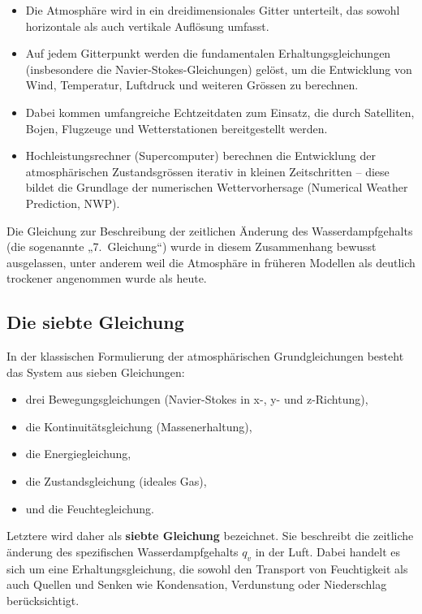 \begin{itemize}
    \item Die Atmosphäre wird in ein dreidimensionales Gitter unterteilt, das sowohl horizontale als auch vertikale Auflösung umfasst.
    \item Auf jedem Gitterpunkt werden die fundamentalen Erhaltungsgleichungen (insbesondere die Navier-Stokes-Gleichungen) gelöst, um die Entwicklung von Wind, Temperatur, Luftdruck und weiteren Grössen zu berechnen.
    \item Dabei kommen umfangreiche Echtzeitdaten zum Einsatz, die durch Satelliten, Bojen, Flugzeuge und Wetterstationen bereitgestellt werden.
    \item Hochleistungsrechner (Supercomputer) berechnen die Entwicklung der atmosphärischen Zustandsgrössen iterativ in kleinen Zeitschritten – diese bildet die Grundlage der numerischen Wettervorhersage (Numerical Weather Prediction, NWP).
\end{itemize}

Die Gleichung zur Beschreibung der zeitlichen Änderung des Wasserdampfgehalts (die sogenannte „7.~Gleichung“) wurde in diesem Zusammenhang bewusst ausgelassen, unter anderem weil die Atmosphäre in früheren Modellen als deutlich trockener angenommen wurde als heute.

\subsection{Die siebte Gleichung}

In der klassischen Formulierung der atmosphärischen Grundgleichungen besteht das System aus sieben Gleichungen:  
\begin{itemize}
    \item drei Bewegungsgleichungen (Navier-Stokes in x-, y- und z-Richtung),
    \item die Kontinuitätsgleichung (Massenerhaltung),
    \item die Energiegleichung,
    \item die Zustandsgleichung (ideales Gas),
    \item und die Feuchtegleichung.
\end{itemize}

Letztere wird daher als \textbf{siebte Gleichung} bezeichnet. Sie beschreibt die zeitliche änderung des spezifischen Wasserdampfgehalts $q_v$ in der Luft. Dabei handelt es sich um eine Erhaltungsgleichung, die sowohl den Transport von Feuchtigkeit als auch Quellen und Senken wie Kondensation, Verdunstung oder Niederschlag berücksichtigt.  

